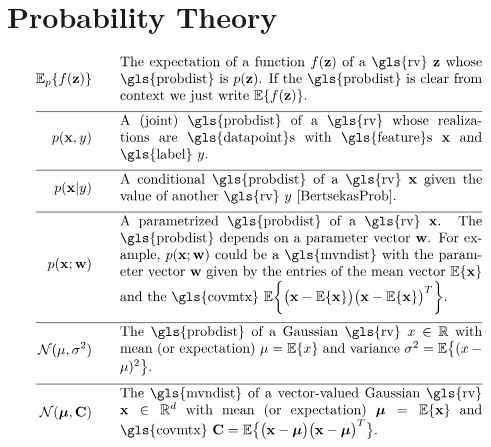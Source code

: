 \section*{Probability Theory} 
\begin{align}
	\expect_{p} \{ f(\datapoint) \}  \quad\quad & \parbox{.75\textwidth}{The expectation of a function $f(\datapoint)$ of a \gls{rv} 
		$\datapoint$ whose \gls{probdist} is $\prob{\datapoint}$. If the \gls{probdist} is clear from context 
		we just write $\expect \{ f(\datapoint) \}$. }  \nonumber \\[2mm] \hline \nonumber\\[-5mm]    
	\prob{\featurevec,\truelabel} \quad\quad & \parbox{.75\textwidth}{A (joint) \gls{probdist} of a \gls{rv} 
		whose realizations are \gls{datapoint}s with \gls{feature}s $\featurevec$ and \gls{label} $\truelabel$.} \nonumber        \nonumber \\[2mm] \hline \nonumber\\[-5mm]        
	\prob{\featurevec|\truelabel} \quad\quad & \parbox{.75\textwidth}{A conditional \gls{probdist} of a \gls{rv} 
		$\featurevec$ given the value of another \gls{rv} $\truelabel$ \cite[Sec.\ 3.5]{BertsekasProb}. } \nonumber       \nonumber \\[2mm] \hline \nonumber\\[-5mm]           
	\prob{\featurevec;\weights} \quad\quad & \parbox{.75\textwidth}{A parametrized \gls{probdist} of a \gls{rv} $\featurevec$. 
		The \gls{probdist} depends on a parameter vector $\weights$. For example, $\prob{\featurevec;\weights}$ could be a 
		\gls{mvndist} with the parameter vector $\weights$ given by the entries of the mean vector $\expect \{ \featurevec \}$ 
		and the \gls{covmtx} $\expect \bigg \{ \big( \featurevec - \expect \{ \featurevec \}\big) \big( \featurevec - \expect \{ \featurevec \}\big)^{T}  \bigg\}$.} \nonumber           \nonumber \\[2mm] \hline \nonumber\\[-5mm]
	\mathcal{N}(\mu, \sigma^{2}) \quad\quad & \parbox{.75\textwidth}{The \gls{probdist} of a Gaussian 
		\gls{rv} $\feature \in \mathbb{R}$ with mean (or expectation) $\mu= \expect \{ \feature \}$ 
		and variance $\sigma^{2} =   \expect \big\{  (  \feature - \mu )^2 \big\}$.} \nonumber    \nonumber \\[2mm] \hline \nonumber\\[-5mm]
	\mathcal{N}(\clustermean, \mathbf{C}) \quad\quad & \parbox{.75\textwidth}{The \gls{mvndist} of a vector-valued 
		 Gaussian \gls{rv} $\featurevec \in \mathbb{R}^{\featuredim}$ with mean (or expectation) $\clustermean= \expect \{ \featurevec \}$ 
		and \gls{covmtx} $\mathbf{C} =  \expect \big\{ \big( \featurevec - \clustermean \big)\big( \featurevec - \clustermean \big)^{T} \big\}$.} \nonumber                                             
\end{align}





